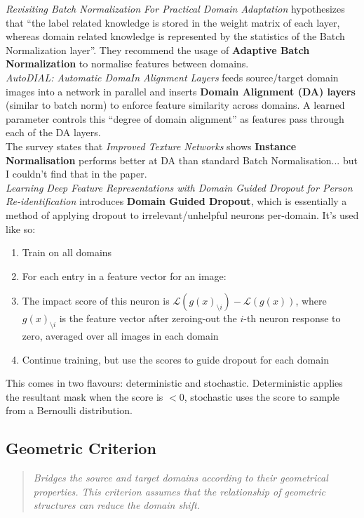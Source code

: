 \documentclass{report}
\newcommand{\quoteit}[1]{\begin{quote}\textit{#1}\end{quote}}
\begin{document}
\textit{Revisiting Batch Normalization For Practical Domain Adaptation}\parencite{revisitingbatchnorm} hypothesizes that ``the label related knowledge is stored in the weight matrix of each layer, whereas domain related knowledge is represented by the statistics of the Batch Normalization layer''. They  recommend the usage of \textbf{Adaptive Batch Normalization} to normalise features between domains. \\

\textit{AutoDIAL: Automatic DomaIn Alignment Layers}\parencite{autodial} feeds source/target domain images into a network in parallel and inserts \textbf{Domain Alignment (DA) layers} (similar to batch norm) to enforce feature similarity across domains. A learned parameter controls this ``degree of domain alignment'' as features pass through each of the DA layers. \\

The survey\parencite{deepdomainsurvey} states that \textit{Improved Texture Networks}\parencite{texturenets} shows \textbf{Instance Normalisation} performs better at DA than standard Batch Normalisation... but I couldn't find that in the paper. \\

\textit{Learning Deep Feature Representations with Domain Guided Dropout for
	Person Re-identification}\parencite{domainguideddropout} introduces \textbf{Domain Guided Dropout}, which is essentially a method of applying dropout to irrelevant/unhelpful neurons per-domain. It's used like so:
\begin{enumerate}
	\item Train on all domains
	\item For each entry in a feature vector for an image:
	\item The impact score of this neuron is $\mathcal{L}(g(x)_{\setminus i})-\mathcal{L}(g(x))$, where $g(x)_{\setminus i}$ is the feature vector after zeroing-out the $i$-th neuron response to zero, averaged over all images in each domain
	\item Continue training, but use the scores to guide dropout for each domain
\end{enumerate}
This comes in two flavours: deterministic and stochastic. Deterministic applies the resultant mask when the score is $<0$, stochastic uses the score to sample from a Bernoulli distribution.

\subsection{Geometric Criterion}
\quoteit{Bridges the source and target domains according to their geometrical properties. This criterion assumes that the relationship of geometric structures can reduce the domain shift.}
\end{document}
